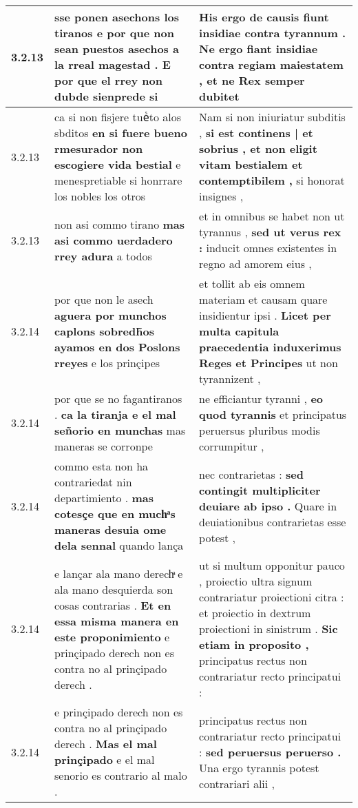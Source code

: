 \begin{tabular}{|p{1cm}|p{6.5cm}|p{6.5cm}|}
3.2.13 & sse ponen asechons los tiranos \textbf{ e por que non sean puestos asechos a la rreal magestad . } E por que el rrey non dubde sienprede si & His ergo de causis fiunt insidiae contra tyrannum . \textbf{ Ne ergo fiant insidiae contra regiam maiestatem , } et ne Rex semper dubitet \\\hline
3.2.13 & ca si non fisjere tueᷤto alos sbditos \textbf{ en si fuere bueno rmesurador non escogiere vida bestial } e menespretiable si honrrare los nobles los otros & Nam si non iniuriatur subditis , \textbf{ si est continens | et sobrius , et non eligit vitam bestialem et contemptibilem , } si honorat insignes , \\\hline
3.2.13 & non asi commo tirano \textbf{ mas asi commo uerdadero rrey adura } a todos & et in omnibus se habet non ut tyrannus , \textbf{ sed ut verus rex : } inducit omnes existentes in regno ad amorem eius , \\\hline
3.2.14 & por que non le asech \textbf{ aguera por munchos caplons sobredh̃os ayamos en dos Poslons rreyes } e los prinçipes & et tollit ab eis omnem materiam et causam quare insidientur ipsi . \textbf{ Licet per multa capitula praecedentia induxerimus Reges et Principes } ut non tyrannizent , \\\hline
3.2.14 & por que se no fagantiranos . \textbf{ ca la tiranja e el mal señorio en munchas } mas maneras se corronpe & ne efficiantur tyranni , \textbf{ eo quod tyrannis } et principatus peruersus pluribus modis corrumpitur , \\\hline
3.2.14 & commo esta non ha contrariedat nin departimiento . \textbf{ mas cotesçe que en muchͣs maneras desuia ome dela sennal } quando lança & nec contrarietas : \textbf{ sed contingit multipliciter deuiare ab ipso . } Quare in deuiationibus contrarietas esse potest , \\\hline
3.2.14 & e lançar ala mano derechͣ e ala mano desquierda son cosas contrarias . \textbf{ Et en essa misma manera en este proponimiento } e prinçipado derech non es contra no al prinçipado derech . & ut si multum opponitur pauco , proiectio ultra signum contrariatur proiectioni citra : et proiectio in dextrum proiectioni in sinistrum . \textbf{ Sic etiam in proposito , } principatus rectus non contrariatur recto principatui : \\\hline
3.2.14 & e prinçipado derech non es contra no al prinçipado derech . \textbf{ Mas el mal prinçipado } e el mal senorio es contrario al malo . & principatus rectus non contrariatur recto principatui : \textbf{ sed peruersus peruerso . } Una ergo tyrannis potest contrariari alii , \\\hline

\end{tabular}
